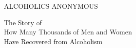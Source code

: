 \newpage
\begin{biblechapter}
\vspace*{9em}

{\centering\Huge
        ALCOHOLICS ANONYMOUS \\
}

\vspace{5em}

{\hfill\itshape 

The Story of \\

How Many Thousands of Men and Women \\

Have Recovered from Alcoholism \\
}
\end{biblechapter}
